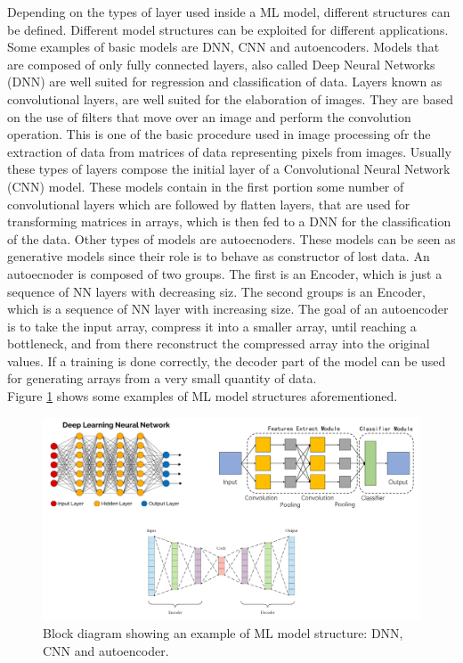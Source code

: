 \documentclass[12pt]{report}
\begin{document}
Depending on the types of layer used inside a ML model, different structures can be defined. Different model structures can be exploited for different applications. Some examples of basic models are DNN, CNN and autoencoders. 
Models that are composed of only fully connected layers, also called Deep Neural Networks (DNN) are well suited for regression and classification of data.
Layers known as convolutional layers, are well suited for the elaboration of images. They are based on the use of filters that move over an image and perform the convolution operation. This is one of the basic procedure used in image processing ofr the extraction of data from matrices of data representing pixels from images. Usually these types of layers compose the initial layer of a Convolutional Neural Network (CNN) model. These models contain in the first portion some number of convolutional layers which are followed by flatten layers, that are used for transforming matrices in arrays, which is then fed to a DNN for the classification of the data.
Other types of models are autoecnoders. These models can be seen as generative models since their role is to behave as constructor of lost data. An autoecnoder is composed of two groups. The first is an Encoder, which is just a sequence of NN layers with decreasing siz. The second groups is an Encoder, which is a sequence of NN layer with increasing size. The goal of an autoencoder is to take the input array, compress it into a smaller array, until reaching a bottleneck, and from there reconstruct the compressed array into the original values. If a training is done correctly, the decoder part of the model can be used for generating arrays from a very small quantity of data.\\
Figure \ref{fig:structures} shows some examples of ML model structures aforementioned.

\begin{figure}[h!]
    \centering
    \includegraphics[width=140mm]{Figures/Chapter1/structures.png} 
    \caption{Block diagram showing an example of ML model structure: DNN, CNN and autoencoder.}
    \label{fig:structures}    
\end{figure}  
\end{document}
